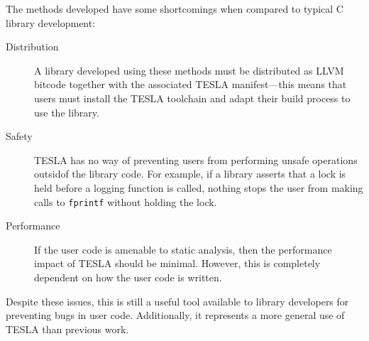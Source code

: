 The methods developed have some shortcomings when compared to typical C library
development:
\begin{description}
  \item[Distribution] A library developed using these methods must be
    distributed as LLVM bitcode together with the associated TESLA
    manifest---this means that users must install the TESLA toolchain and adapt
    their build process to use the library.

  \item[Safety] TESLA has no way of preventing users from performing unsafe
    operations outsidof the library code. For example, if a library asserts that
    a lock is held before a logging function is called, nothing stops the user
    from making calls to \texttt{fprintf} without holding the lock.

  \item[Performance] If the user code is amenable to static analysis, then the
    performance impact of TESLA should be minimal. However, this is completely
    dependent on how the user code is written.
\end{description}

Despite these issues, this is still a useful tool available to library
developers for preventing bugs in user code. Additionally, it represents a more
general use of TESLA than previous work.
